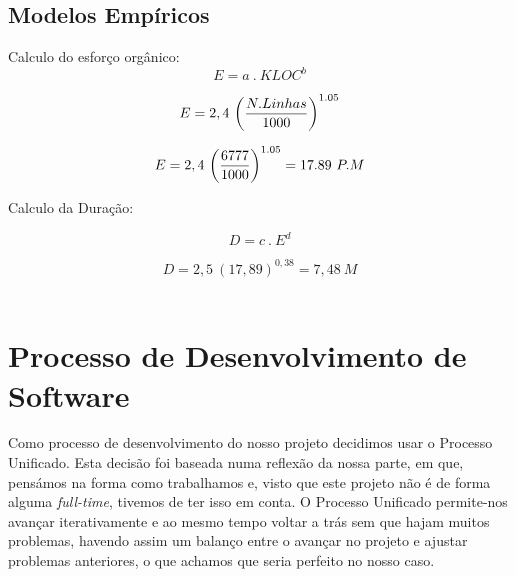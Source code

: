 \documentclass[12pt, a4paper, twoside]{report} %
\begin{document}


\subsection{Modelos Empíricos}

Calculo do esforço orgânico:
\\

\begin{equation}
E = a \ . \ KLOC ^ b
\end{equation}

\begin{equation} 
E = 2,4 \ \bigg({N.Linhas \over 1000}\bigg)^{1.05}
\end{equation}

\begin{equation}
{E = 2,4 \ \bigg({6777 \over 1000}\bigg) ^ {1.05}}
= 17.89 \ P.M
\end{equation}

Calculo da Duração:

\begin{equation}
D = c \ . \ E^d
\end{equation}

\begin{equation}
D = 2,5 \ (17,89)^{0,38}= 7,48\ M
\end{equation}
\\


\section{Processo de Desenvolvimento de Software}

Como processo de desenvolvimento do nosso projeto decidimos usar o Processo Unificado.
Esta decisão foi baseada numa reflexão da nossa parte, em que, pensámos na forma como trabalhamos e, visto que este projeto não é de forma alguma \textit{full-time}, tivemos de ter isso em conta. O Processo Unificado permite-nos avançar iterativamente e ao mesmo tempo voltar a trás sem que hajam muitos problemas, havendo assim um balanço entre o avançar no projeto e ajustar problemas anteriores, o que achamos que seria perfeito no nosso caso.
\\
\end{document}
